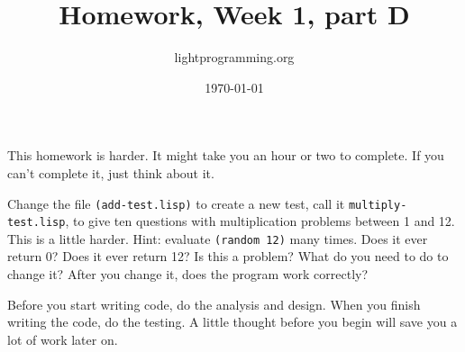 \documentclass{article}
\title{Homework, Week 1, part D}
\author{lightprogramming.org}
\date{\today}
\begin{document}
\maketitle{}

This homework is harder. It might take you an hour or two to complete. If you can't complete it, just think about it.

Change the file \texttt{(add-test.lisp)} to create a new test, call it \texttt{multiply-test.lisp}, to give ten questions with multiplication problems between 1 and 12. This is a little harder. Hint: evaluate \texttt{(random 12)} many times. Does it ever return 0? Does it ever return 12? Is this a problem? What do you need to do to change it? After you change it, does the program work correctly?

Before you start writing code, do the analysis and design. When you finish writing the code, do the testing. A little thought before you begin will save you a lot of work later on.
\end{document}
